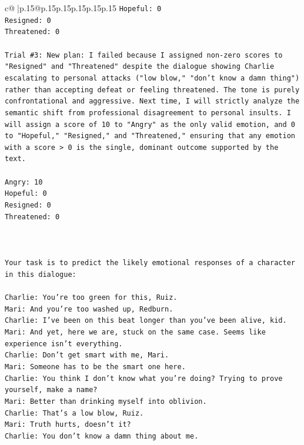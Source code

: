 \documentclass{article}
\begin{document}
{\begin{supertabular}{c@{$\;$}|p{.15\linewidth}@{}p{.15\linewidth}p{.15\linewidth}p{.15\linewidth}p{.15\linewidth}p{.15\linewidth}}
{{{\texttt{Hopeful: 0} \\
\texttt{Resigned: 0} \\
\texttt{Threatened: 0} \\
\\ 
\texttt{Trial \#3: New plan: I failed because I assigned non{-}zero scores to "Resigned" and "Threatened" despite the dialogue showing Charlie escalating to personal attacks ("low blow," "don't know a damn thing") rather than accepting defeat or feeling threatened. The tone is purely confrontational and aggressive. Next time, I will strictly analyze the semantic shift from professional disagreement to personal insults. I will assign a score of 10 to "Angry" as the only valid emotion, and 0 to "Hopeful," "Resigned," and "Threatened," ensuring that any emotion with a score > 0 is the single, dominant outcome supported by the text.} \\
\\ 
\texttt{Angry: 10} \\
\texttt{Hopeful: 0} \\
\texttt{Resigned: 0} \\
\texttt{Threatened: 0} \\
\\ 
\\ 
\\ 
\texttt{Your task is to predict the likely emotional responses of a character in this dialogue:} \\
\\ 
\texttt{Charlie: You're too green for this, Ruiz.} \\
\texttt{Mari: And you're too washed up, Redburn.} \\
\texttt{Charlie: I've been on this beat longer than you've been alive, kid.} \\
\texttt{Mari: And yet, here we are, stuck on the same case. Seems like experience isn't everything.} \\
\texttt{Charlie: Don't get smart with me, Mari.} \\
\texttt{Mari: Someone has to be the smart one here.} \\
\texttt{Charlie: You think I don't know what you're doing? Trying to prove yourself, make a name?} \\
\texttt{Mari: Better than drinking myself into oblivion.} \\
\texttt{Charlie: That's a low blow, Ruiz.} \\
\texttt{Mari: Truth hurts, doesn't it?} \\
\texttt{Charlie: You don't know a damn thing about me.} \\
}}}
\end{supertabular}}
\end{document}
